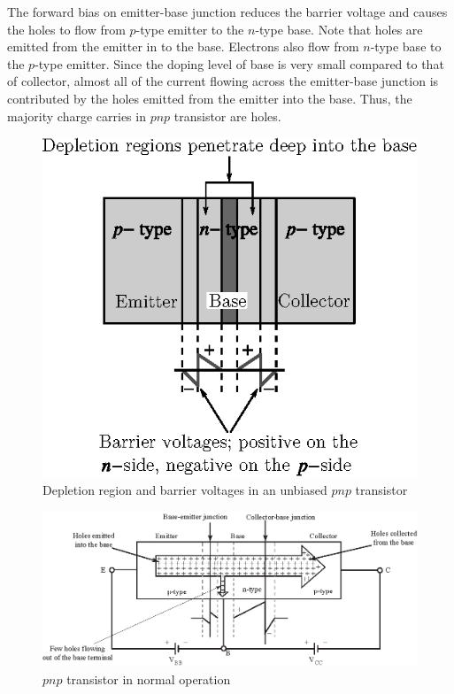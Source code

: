 The forward bias on emitter-base junction reduces the barrier voltage and causes the holes to flow from $p$-type emitter to the $n$-type base. Note that holes are emitted from the emitter in to the base. Electrons also flow from $n$-type base to the $p$-type emitter. Since the doping level of base is very small compared to that of collector, almost all of the current flowing across the emitter-base junction is contributed by the holes emitted from the emitter into the base. Thus, the majority charge carries in $pnp$ transistor are holes.
\begin{figure}[H]
\centering
\includegraphics{chap2/fig2.5.eps}
\caption{Depletion region and barrier voltages in an unbiased $pnp$ transistor}\label{fig3.5}
\end{figure}

\begin{figure}[H]
\centering
\includegraphics{chap2/S3-EE-03-006.eps}
\caption{$pnp$ transistor in normal operation}\label{fig3.6}
\end{figure}

